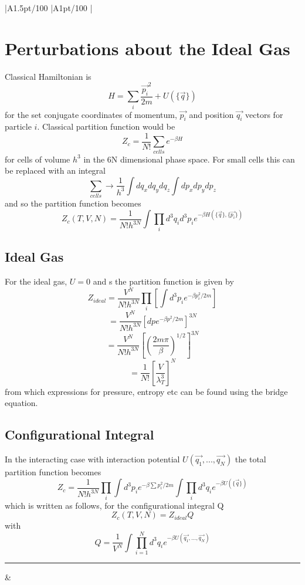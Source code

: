 \documentclass[table,cmyk]{article}
\makeatletter
\newcommand\ratio[2]{\strip@pt\dimexpr#1pt/#2\relax}
\makeatother
\begin{document}
\begin{longtable}
{
    |A{1.5}{\ratio{50}{100}}%
    |A{1}{\ratio{50}{100}}%
    |%
}\hline
\section*{Perturbations about the Ideal Gas}
Classical Hamiltonian is
\[H = \sum_{i} \frac{\vec{p_i}^2}{2m}+U(\{\vec{q}\})\]
for the set conjugate coordinates of momentum, $\vec{p_i}$ and position $\vec{q_i}$ vectors for particle $i$.
Classical partition function would be
\[Z_c = \frac{1}{N!}\sum_{cells} e^{-\beta H}\]
for cells of volume $h^3$ in the 6N dimensional phase space. For small cells this can be replaced with an integral
\[\sum_{cells} \rightarrow \frac{1}{h^3}\int dq_xdq_ydq_z\int dp_xdp_ydp_z\]
and so the partition function becomes
\[Z_c(T,V,N) = \frac{1}{N!h^{3N}}\int \prod_{i} d^3q_id^3p_ie^{-\beta H(\{\vec{q}\},\{\vec{p_i}\})}\]
\subsection*{Ideal Gas}
For the ideal gas, $U = 0$ and s the partition function is given by
\[Z_{ideal} = \frac{V^N}{N!h^{3N}}\prod_{i}\left[ \int d^3p_ie^{-\beta p_i^2/2m}\right] \]
\[= \frac{V^N}{N!h^{3N}}\left[ dp e^{-\beta p^2/2m}\right]^{3N}\]
\[= \frac{V^N}{N!h^{3N}} \left[ \left(\frac{2m\pi }{\beta}\right)^{1/2}\right]^{3N}\]
\[=\frac{1}{N!}\left[ \frac{V}{\lambda_T^3}\right]^N\]
from which expressions for pressure, entropy etc can be found using the bridge equation.
\subsection*{Configurational Integral}
In the interacting case with interaction potential $U(\vec{q_1},...,\vec{q_N})$
the total partition function becomes
\[Z_c = \frac{1}{N!h^{3N}} \prod_{i} \int d^3p_i e^{-\beta\sum p_i^2/2m}\int \prod_{i} d^3q_i e^{-\beta U(\{\vec{q}\})}\]
which is written as follows, for the configurational integral Q
\[Z_c(T,V,N) = Z_{ideal}Q\]
with
\[Q = \frac{1}{V^N} \int \prod_{i=1}^{N}d^3q_i e^{-\beta U(\vec{q_1},...,\vec{q_N})}\]
\vspace{2cm}

\noindent\rule{9cm}{0.4pt}
&

\end{longtable}
\end{document}
